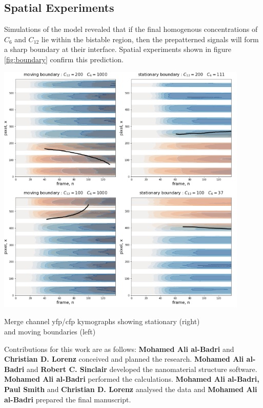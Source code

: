 \subsection{Spatial Experiments}
Simulations of the model revealed that if the final homogenous concentrations
of $C_6$ and $C_{12}$ lie within the bistable region, then the prepatterned
signals will form a sharp boundary at their interface. Spatial experiments
shown in figure \ref{fig:boundary} confirm this prediction.
\begin{Figure}
\includegraphics[width=120mm]{figures/spatial.png}
\caption{Merge channel yfp/cfp kymographs showing stationary (right)\\and moving boundaries (left)}
\label{fig:boundary}
\end{Figure}


Contributions for this work are as follows: \textbf{Mohamed Ali al-Badri} and \textbf{Christian D. Lorenz} conceived and planned the research. \textbf{Mohamed Ali al-Badri} and \textbf{Robert C. Sinclair} developed the nanomaterial structure software. \textbf{Mohamed Ali al-Badri} performed the calculations. \textbf{Mohamed Ali al-Badri, Paul Smith} and \textbf{Christian D. Lorenz} analysed the data and \textbf{Mohamed Ali al-Badri} prepared the final manuscript.

